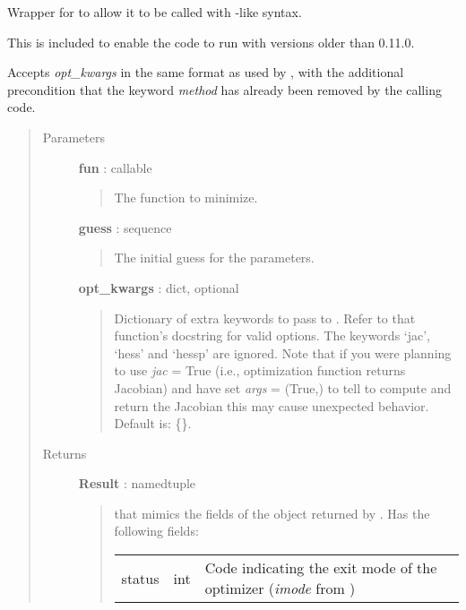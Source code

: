 \documentclass[letterpaper,10pt,english]{sphinxmanual}
\begin{document}
\begin{fulllineitems}
\label{gptools:gptools.utils.wrap_fmin_slsqp}
Wrapper for  to allow it to be called with -like syntax.

This is included to enable the code to run with  versions
older than 0.11.0.

Accepts \emph{opt\_kwargs} in the same format as used by
, with the additional precondition
that the keyword \emph{method} has already been removed by the calling code.
\begin{quote}\begin{description}
\item[{Parameters}] \leavevmode
\textbf{fun} : callable
\begin{quote}

The function to minimize.
\end{quote}

\textbf{guess} : sequence
\begin{quote}

The initial guess for the parameters.
\end{quote}

\textbf{opt\_kwargs} : dict, optional
\begin{quote}

Dictionary of extra keywords to pass to
. Refer to that function's
docstring for valid options. The keywords `jac', `hess' and `hessp'
are ignored. Note that if you were planning to use \emph{jac} = True
(i.e., optimization function returns Jacobian) and have set
\emph{args} = (True,) to tell  to
compute and return the Jacobian this may cause unexpected behavior.
Default is: \{\}.
\end{quote}

\item[{Returns}] \leavevmode
\textbf{Result} : namedtuple
\begin{quote}

 that mimics the fields of the
 object returned by
. Has the following fields:

\begin{tabulary}{\linewidth}{|L|L|L|}
\hline

status
 & 
int
 & 
Code indicating the exit mode of the optimizer (\emph{imode} from )
\\


\end{tabulary}
\end{quote}
\end{description}
\end{quote}
\end{fulllineitems}
\end{document}
